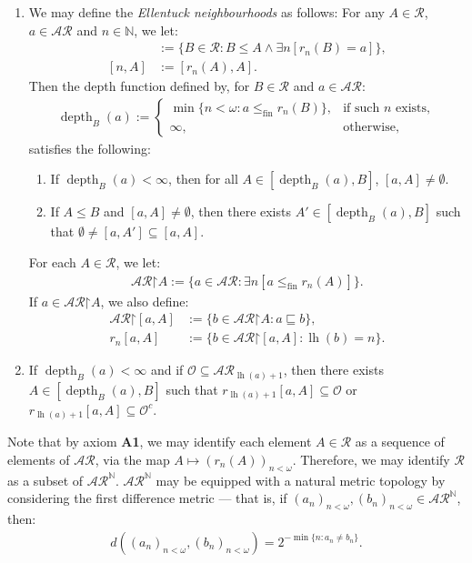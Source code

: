 \documentclass[11pt,reqno]{amsart}
\theoremstyle{plain}
\numberwithin{equation}{section}
\theoremstyle{definition}
\newcommand{\func}{\operatorname}
\newcommand{\N}{\mathbb{N}}
\newcommand{\cal}{\mathcal}
\newcommand{\restrictedto}{\mathord{\upharpoonright}}
\newcommand{\lh}{\func{lh}}
\renewcommand{\O}{\cal{O}}
\newcommand{\depth}{\func{depth}}
\newcommand{\fin}{\mathrm{fin}}
\begin{document}
\begin{enumerate}
    \item[\textbf{(A3)}] We may define the \emph{Ellentuck neighbourhoods} as follows: For any $A \in \cal{R}$, $a \in \cal{AR}$ and $n \in \N$, we let:
    \begin{align*}
        [a,A] &:= \{B \in \cal{R} : B \leq A \wedge \exists n[r_n(B) = a]\}, \\
        [n,A] &:= [r_n(A),A].
    \end{align*}
    Then the depth function defined by, for $B \in \cal{R}$ and $a \in \cal{AR}$:
    \begin{align*}
        \depth_B(a) := 
        \begin{cases}
            \min\{n < \omega : a \leq_\fin r_n(B)\}, &\text{if such $n$ exists}, \\
            \infty, &\text{otherwise},
        \end{cases}
    \end{align*}
    satisfies the following:
    \begin{enumerate}[label=(\arabic*)]
        \item If $\depth_B(a) < \infty$, then for all $A \in [\depth_B(a),B]$, $[a,A] \neq \emptyset$.

        \item If $A \leq B$ and $[a,A] \neq \emptyset$, then there exists $A' \in [\depth_B(a),B]$ such that $\emptyset \neq [a,A'] \subseteq [a,A]$.
    \end{enumerate}
    For each $A \in \cal{R}$, we let:
    \begin{align*}
        \cal{AR}\restrictedto A := \{a \in \cal{AR} : \exists n[a \leq_\fin r_n(A)]\}.
    \end{align*}
    If $a \in \cal{AR}\restrictedto A$, we also define:
    \begin{align*}
        \cal{AR}\restrictedto[a,A] &:= \{b \in \cal{AR}\restrictedto A : a \sqsubseteq b\}, \\
        r_n[a,A] &:= \{b \in \cal{AR}\restrictedto[a,A] : \lh(b) = n\}.
    \end{align*}

    \item[\textbf{(A4)}] If $\depth_B(a) < \infty$ and if $\O \subseteq \cal{AR}_{\lh(a)+1}$, then there exists $A \in [\depth_B(a),B]$ such that $r_{\lh(a)+1}[a,A] \subseteq \O$ or $r_{\lh(a)+1}[a,A] \subseteq \O^c$.
\end{enumerate}

Note that by axiom \textbf{A1}, we may identify each element $A \in \cal{R}$ as a sequence of elements of $\cal{AR}$, via the map $A \mapsto (r_n(A))_{n<\omega}$. Therefore, we may identify $\cal{R}$ as a subset of $\cal{AR}^\N$. $\cal{AR}^\N$ may be equipped with a natural metric topology by considering the first difference metric --- that is, if $(a_n)_{n<\omega},(b_n)_{n<\omega} \in \cal{AR}^\N$, then:
\begin{align*}
    d((a_n)_{n<\omega},(b_n)_{n<\omega}) = 2^{-\min\{n : a_n \neq b_n\}}.
\end{align*}
\end{document}
